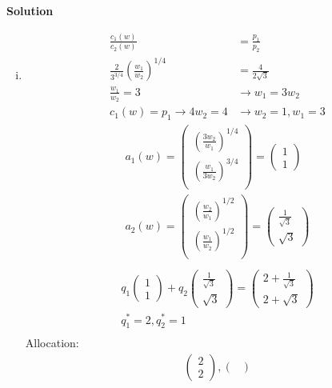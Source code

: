 \documentclass[a4paper]{article}
\begin{document}
\textbf{Solution}
\begin{enumerate}[(i)]
\item \begin{align*}
\frac{c_1(w)}{c_2(w)} &= \frac{p_1}{p_2}\\
\frac{2}{3^{3/4}}\left(\frac{w_1}{w_2}\right)^{1/4} &= \frac{4}{2\sqrt{3}}\\
\frac{w_1}{w_2} = 3 &\to w_1 = 3w_2\\
c_1(w) = p_1 \to 4w_2 = 4 &\to w_2 = 1, w_1 = 3
\end{align*}
\begin{align*}
a_1(w) = \begin{pmatrix}
\left(\frac{3w_2}{w_1}\right)^{1/4}\\
\left(\frac{w_1}{3w_2}\right)^{3/4}\\
\end{pmatrix} = \begin{pmatrix}
1\\
1
\end{pmatrix}\\
a_2(w) = \begin{pmatrix}
\left(\frac{w_2}{w_1}\right)^{1/2}\\
\left(\frac{w_1}{w_2}\right)^{1/2}\\
\end{pmatrix} = \begin{pmatrix}
\frac{1}{\sqrt{3}}\\
\sqrt{3}
\end{pmatrix}\\
\end{align*}
\begin{align*}
q_1 \begin{pmatrix}
1\\
1
\end{pmatrix} + q_2 \begin{pmatrix}
\frac{1}{\sqrt{3}}\\
\sqrt{3}
\end{pmatrix} = \begin{pmatrix}
2 + \frac{1}{\sqrt{3}}\\
2 + \sqrt{3}
\end{pmatrix}\\
q_1^* = 2, q_2^* = 1\\
\end{align*}
Allocation:
\begin{align*}
\begin{pmatrix}
2\\
2
\end{pmatrix}, \begin{pmatrix}

\end{pmatrix}
\end{align*}
\end{enumerate}
\end{document}
